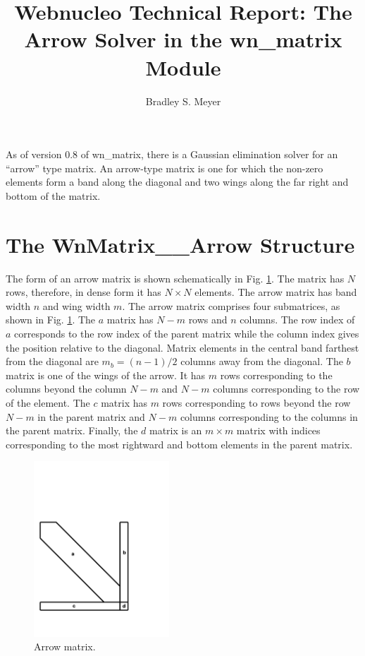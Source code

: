 \documentclass{article}    %
\title{Webnucleo Technical Report: The Arrow Solver in the wn\_matrix Module}
\author{Bradley S. Meyer}
\begin{document}

\maketitle                 %

As of version 0.8 of wn\_matrix, there is a Gaussian elimination solver for
an ``arrow'' type matrix.  An arrow-type matrix is one for which the non-zero
elements form a band along the diagonal and two wings along the far right
and bottom of the matrix.  

\section{The WnMatrix\_\_Arrow Structure}

The form of an arrow matrix is shown schematically in Fig.
\ref{fig:arrow}.  The matrix has $N$ rows, therefore, in dense form it has
$N \times N$ elements.  The arrow matrix has band width $n$ and wing width
$m$.  The arrow matrix comprises four submatrices, as shown in
Fig. \ref{fig:arrow}.  The $a$ matrix has $N - m$ rows and $n$ columns.
The row index of $a$ corresponds to the row index of the parent matrix
while the column index gives the position relative to the diagonal.  Matrix
elements in the central band
farthest from the diagonal are $m_b = (n - 1)/2$ columns away from the
diagonal.  The $b$ matrix is one of the wings of the arrow.  It has $m$
rows corresponding to the columns beyond the column $N - m$ and $N - m$
columns corresponding to the row of the element.  The $c$ matrix has
$m$ rows corresponding to rows beyond the row $N - m$ in the parent matrix
and $N - m$ columns corresponding to the columns in the parent matrix.
Finally, the $d$ matrix is an $m \times m$ matrix with indices corresponding
to the most rightward and bottom elements in the parent matrix.

\begin{figure}[thp]
\centering
\includegraphics[width=2in]{figures/matrix1.pdf}
\caption{Arrow matrix.}
\label{fig:arrow}
\end{figure}
\end{document}

